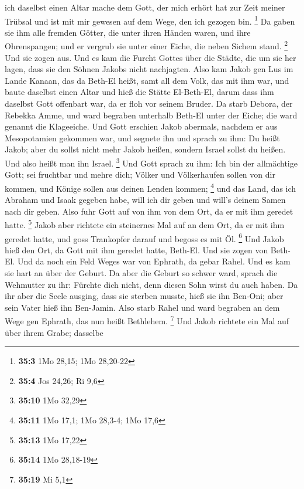 ich daselbst einen Altar mache dem Gott, der mich erhört hat zur Zeit
meiner Trübsal und ist mit mir gewesen auf dem Wege, den ich gezogen
bin. \footnote{\textbf{35:3} 1Mo 28,15; 1Mo 28,20-22}  Da
gaben sie ihm alle fremden Götter, die unter ihren Händen waren, und
ihre Ohrenspangen; und er vergrub sie unter einer Eiche, die neben
Sichem stand. \footnote{\textbf{35:4} Jos 24,26; Ri 9,6} 
Und sie zogen aus. Und es kam die Furcht Gottes über die Städte, die um
sie her lagen, dass sie den Söhnen Jakobs nicht nachjagten. 
Also kam Jakob gen Lus im Lande Kanaan, das da Beth-El heißt, samt all
dem Volk, das mit ihm war,  und baute daselbst einen Altar
und hieß die Stätte El-Beth-El, darum dass ihm daselbst Gott offenbart
war, da er floh vor seinem Bruder.  Da starb Debora, der
Rebekka Amme, und ward begraben unterhalb Beth-El unter der Eiche; die
ward genannt die Klageeiche.  Und Gott erschien Jakob
abermals, nachdem er aus Mesopotamien gekommen war, und segnete ihn
 und sprach zu ihm: Du heißt Jakob; aber du sollst nicht
mehr Jakob heißen, sondern Israel sollst du heißen. Und also heißt man
ihn Israel. \footnote{\textbf{35:10} 1Mo 32,29}  Und Gott
sprach zu ihm: Ich bin der allmächtige Gott; sei fruchtbar und mehre
dich; Völker und Völkerhaufen sollen von dir kommen, und Könige sollen
aus deinen Lenden kommen; \footnote{\textbf{35:11} 1Mo 17,1; 1Mo 28,3-4;
  1Mo 17,6}  und das Land, das ich Abraham und Isaak
gegeben habe, will ich dir geben und will's deinem Samen nach dir geben.
 Also fuhr Gott auf von ihm von dem Ort, da er mit ihm
geredet hatte. \footnote{\textbf{35:13} 1Mo 17,22}  Jakob
aber richtete ein steinernes Mal auf an dem Ort, da er mit ihm geredet
hatte, und goss Trankopfer darauf und begoss es mit Öl. \footnote{\textbf{35:14}
  1Mo 28,18-19}  Und Jakob hieß den Ort, da Gott mit ihm
geredet hatte, Beth-El.  Und sie zogen von Beth-El. Und da
noch ein Feld Weges war von Ephrath, da gebar Rahel.  Und
es kam sie hart an über der Geburt. Da aber die Geburt so schwer ward,
sprach die Wehmutter zu ihr: Fürchte dich nicht, denn diesen Sohn wirst
du auch haben.  Da ihr aber die Seele ausging, dass sie
sterben musste, hieß sie ihn Ben-Oni; aber sein Vater hieß ihn
Ben-Jamin.  Also starb Rahel und ward begraben an dem Wege
gen Ephrath, das nun heißt Bethlehem. \footnote{\textbf{35:19} Mi 5,1}
 Und Jakob richtete ein Mal auf über ihrem Grabe; dasselbe
